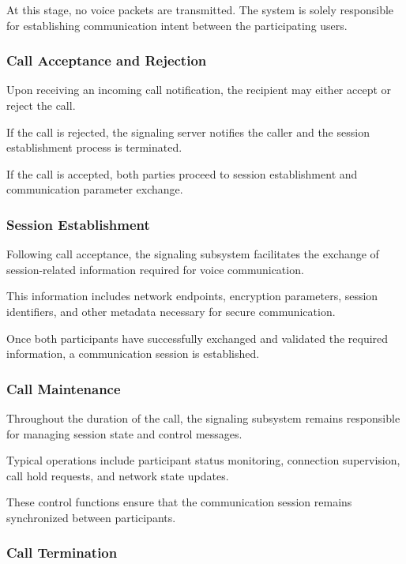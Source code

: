 At this stage, no voice packets are transmitted. The system is solely responsible for establishing communication intent between the participating users.

\subsubsection{Call Acceptance and Rejection}

Upon receiving an incoming call notification, the recipient may either accept or reject the call.

If the call is rejected, the signaling server notifies the caller and the session establishment process is terminated.

If the call is accepted, both parties proceed to session establishment and communication parameter exchange.

\subsubsection{Session Establishment}

Following call acceptance, the signaling subsystem facilitates the exchange of session-related information required for voice communication.

This information includes network endpoints, encryption parameters, session identifiers, and other metadata necessary for secure communication.

Once both participants have successfully exchanged and validated the required information, a communication session is established.

\subsubsection{Call Maintenance}

Throughout the duration of the call, the signaling subsystem remains responsible for managing session state and control messages.

Typical operations include participant status monitoring, connection supervision, call hold requests, and network state updates.

These control functions ensure that the communication session remains synchronized between participants.

\subsubsection{Call Termination}

